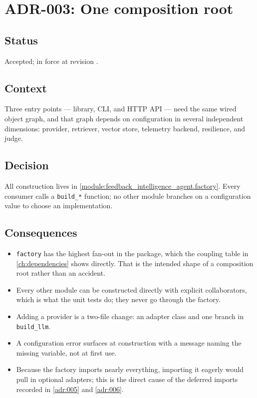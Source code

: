 \section{ADR-003: One composition root}
\label{adr:003}

\subsection*{Status}

Accepted; in force at revision \texttt{\projectrevisionshort}.

\subsection*{Context}

Three entry points --- library, CLI, and HTTP API --- need the same wired
object graph, and that graph depends on configuration in several independent
dimensions: provider, retriever, vector store, telemetry backend, resilience,
and judge.

\subsection*{Decision}

All construction lives in
\cref{module:feedback_intelligence_agent.factory}. Every consumer calls a
\texttt{build\_*} function; no other module branches on a configuration value
to choose an implementation.

\subsection*{Consequences}

\begin{itemize}
  \item \texttt{factory} has the highest fan-out in the package, which the
    coupling table in \cref{ch:dependencies} shows directly. That is the
    intended shape of a composition root rather than an accident.
  \item Every other module can be constructed directly with explicit
    collaborators, which is what the unit tests do; they never go through the
    factory.
  \item Adding a provider is a two-file change: an adapter class and one branch
    in \texttt{build\_llm}.
  \item A configuration error surfaces at construction with a message naming
    the missing variable, not at first use.
  \item Because the factory imports nearly everything, importing it eagerly
    would pull in optional adapters; this is the direct cause of the deferred
    imports recorded in \cref{adr:005} and \cref{adr:006}.
\end{itemize}

